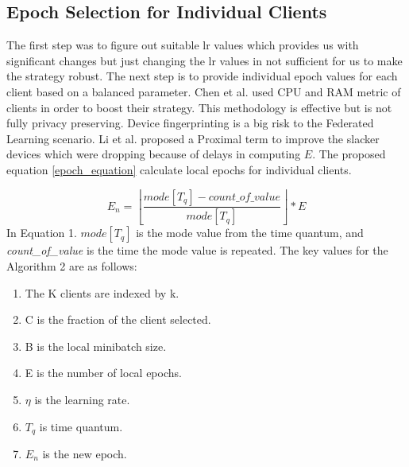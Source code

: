 \documentclass[conference]{IEEEtran}
\begin{document}
\subsection{Epoch Selection for Individual Clients}
The first step was to figure out suitable lr values which provides us with significant changes but just changing the lr values in not sufficient for us to make the strategy robust. The next step is to provide individual epoch values for each client based on a balanced parameter. Chen et al. \cite{chen2023boosting} used CPU and RAM metric of clients in order to boost their strategy. This methodology is effective but is not fully privacy preserving. Device fingerprinting is a big risk to the Federated Learning scenario.  Li et al. \cite{li2020federated} proposed a Proximal term to improve the slacker devices which were dropping because of delays in computing $E$. The proposed equation \ref{epoch_equation} calculate local epochs for individual clients.

\begin{equation}
	E_n = \left \lfloor\frac{mode[T_q] - count\_of\_value}{mode[T_q]}\right \rfloor * E 
	\label{epoch_equation}
\end{equation}
In Equation 1.\textit{ $mode[T_q]$} is the mode value from the time quantum, and \textit{count\_of\_value} is the time the mode value is repeated.
The key values for the Algorithm 2 are as follows:
\begin{enumerate}
	\item The K clients are indexed by k.
	\item C is the fraction of the client selected.
	\item B is the local minibatch size.
	\item E is the number of local epochs.
	\item $\eta$ is the learning rate.
	\item $T_q$ is time quantum.
	\item $E_n$ is the new epoch.
\end{enumerate}
\end{document}
